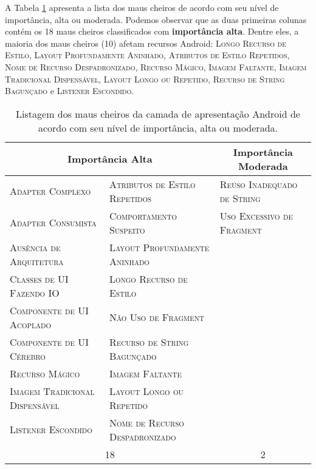 A Tabela \ref{tab:SmellImportance} apresenta a lista dos maus cheiros de acordo com seu nível de importância, alta ou moderada. Podemos observar que as duas primeiras colunas contém os 18 maus cheiros classificados com \textbf{\small importância alta}. Dentre eles, a maioria dos maus cheiros (10) afetam recursos Android: \textsc{\small Longo Recurso de Estilo}, \textsc{\small Layout Profundamente Aninhado}, \textsc{\small Atributos de Estilo Repetidos}, \textsc{\small Nome de Recurso Despadronizado}, \textsc{\small Recurso Mágico}, \textsc{\small Imagem Faltante}, \textsc{\small Imagem Tradicional Dispensável}, \textsc{\small Layout Longo ou Repetido}, \textsc{\small Recurso de String Bagunçado} e \textsc{\small Listener Escondido}.

\begin{table}[!htb]
\centering
\renewcommand*{\arraystretch}{1}
\footnotesize
\caption{Listagem dos maus cheiros da camada de apresentação Android de acordo com seu nível de importância, alta ou moderada.}
\begin{tabular}{@{}p{5.2cm}p{5.2cm}p{5.2cm}@{}}
\toprule
\multicolumn{2}{c}{\textbf{Importância Alta}} & \multicolumn{1}{c}{\textbf{Importância Moderada}}  \\
\bottomrule
\textsc{\scriptsize Adapter Complexo}              & \textsc{\scriptsize Atributos de Estilo Repetidos} & \textsc{\scriptsize Reúso Inadequado de String} \\
\textsc{\scriptsize Adapter Consumista}            & \textsc{\scriptsize Comportamento Suspeito}        & \textsc{\scriptsize Uso Excessivo de Fragment} \\
\textsc{\scriptsize Ausência de Arquitetura}       & \textsc{\scriptsize Layout Profundamente Aninhado} \\
\textsc{\scriptsize Classes de UI Fazendo IO}      & \textsc{\scriptsize Longo Recurso de Estilo}       \\
\textsc{\scriptsize Componente de UI Acoplado}     & \textsc{\scriptsize Não Uso de Fragment}           \\
\textsc{\scriptsize Componente de UI Cérebro}      & \textsc{\scriptsize Recurso de String Bagunçado}   \\
\textsc{\scriptsize Recurso Mágico}                & \textsc{\scriptsize Imagem Faltante}               \\
\textsc{\scriptsize Imagem Tradicional Dispensável}& \textsc{\scriptsize Layout Longo ou Repetido}      \\
\textsc{\scriptsize Listener Escondido}            & \textsc{\scriptsize Nome de Recurso Despadronizado}\\
\toprule
\multicolumn{2}{c}{18} & \multicolumn{1}{c}{2}  \\
\bottomrule
\end{tabular}
\label{tab:SmellImportance}
\end{table}

